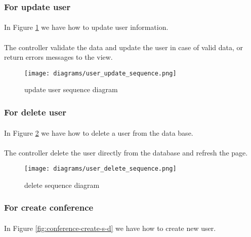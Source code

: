	\subsubsection{For update user}
	\paragraph{}
	In Figure \ref{fig:user-update-s-d} we have how to update user information.
	\paragraph{}
	The controller validate the data and update the user in case of valid data, or return errors messages to the view.
	
		\begin{figure}[!ht]
			\centering
			\texttt{[image: diagrams/user\_update\_sequence.png]}
			\caption{update user sequence diagram}
			\label{fig:user-update-s-d}
		\end{figure}
	
	\subsubsection{For delete user}
	\paragraph{}
	In Figure \ref{fig:user-delete-s-d} we have how to delete a user from the data base.
	\paragraph{}
	The controller delete the user directly from the database and refresh the page.

		\begin{figure}[!ht]
			\centering
			\texttt{[image: diagrams/user\_delete\_sequence.png]}
			\caption{delete sequence diagram}
			\label{fig:user-delete-s-d}
		\end{figure}
	
	\subsubsection{For create conference}
	\paragraph{}
	In Figure \ref{fig:conference-create-s-d} we have how to create new user.
